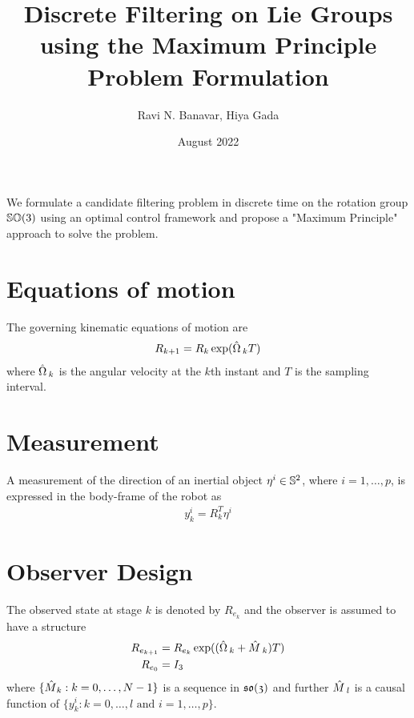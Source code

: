 \documentclass[12pt]{article}
\title{Discrete Filtering on Lie Groups using the Maximum Principle
\\ \small{Problem Formulation}}
\author{Ravi N. Banavar, Hiya Gada}
\date{August 2022}
\begin{document}
\maketitle
\thispagestyle{empty} 

We formulate a candidate filtering problem in discrete time on the rotation group 
$\mathbb{SO}(3)$ using an optimal control framework 
and propose a "Maximum Principle" approach to solve the problem.




\section{Equations of motion}
The governing kinematic equations of motion are
    \begin{align}
		R_{k+1} = R_k \exp (\mathop{\hat{\Omega}}{}_k T)
	\end{align}
 where $\mathop{\hat{\Omega}}{}_k$ is the angular velocity at the $k$th instant and $T$ is the sampling interval. 

\section{Measurement}
A measurement of the direction of an inertial object $\eta^i \in \mathbb{S}^{2}$, where $i = 1, \dots, p$, is expressed in the body-frame of the robot as
 	\begin{align}
		y_k^i = R_k^T \eta^i
	\end{align}

\section{Observer Design}
The observed state at stage $k$ is denoted by $R_{e_k}$ and the observer
is assumed to have a structure
%
 	\begin{align}
		R_{e_{k+1}} &= R_{e_{k}} \exp (( \mathop{\hat{\Omega}}{} _k + \mathop{\hat{M}}{}_k)T)\\
		R_{e_0} &= I_{3}
	\end{align}
where $\{ \mathop{\hat{M}}_k : k = 0, \ldots, N-1\} $ is a sequence in $\mathfrak{so(3)}$ and further $\mathop{\hat{M}}{}_l$ is a 
causal function of $ \{ y_k^i : k = 0, \ldots, l \text{ and } i = 1, \dots, p\} $.
\end{document}
